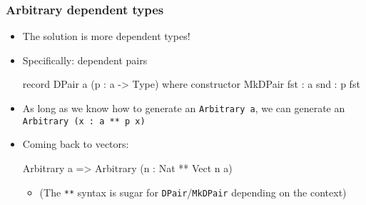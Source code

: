 \documentclass[compress,handout]{beamer}
\begin{document}
\begin{frame}[fragile]
  \frametitle{Arbitrary dependent types}

  \begin{itemize}
    \item The solution is more dependent types!
    \item Specifically: dependent pairs

    \vspace*{-6mm}
    \begin{idrislisting}
record DPair a (p : a -> Type) where
  constructor MkDPair
  fst : a
  snd : p fst
    \end{idrislisting}
    \vspace*{-3mm}

    \item As long as we know how to generate an {\textasciigrave
          \texttt{Arbitrary a}\textasciigrave}, we can generate an
          {\textasciigrave\texttt{Arbitrary (x : a ** p x)}\textasciigrave}
    \item Coming back to vectors:
    \vspace*{-6mm}
    \begin{idrislisting}
Arbitrary a => Arbitrary (n : Nat ** Vect n a)
    \end{idrislisting}
    \begin{itemize}
    \vspace*{-2mm}

      \item (The \texttt{**} syntax is sugar for \texttt{DPair}/\texttt{MkDPair}
            depending on the context)
    \end{itemize}
  \end{itemize}

\end{frame}
\end{document}
